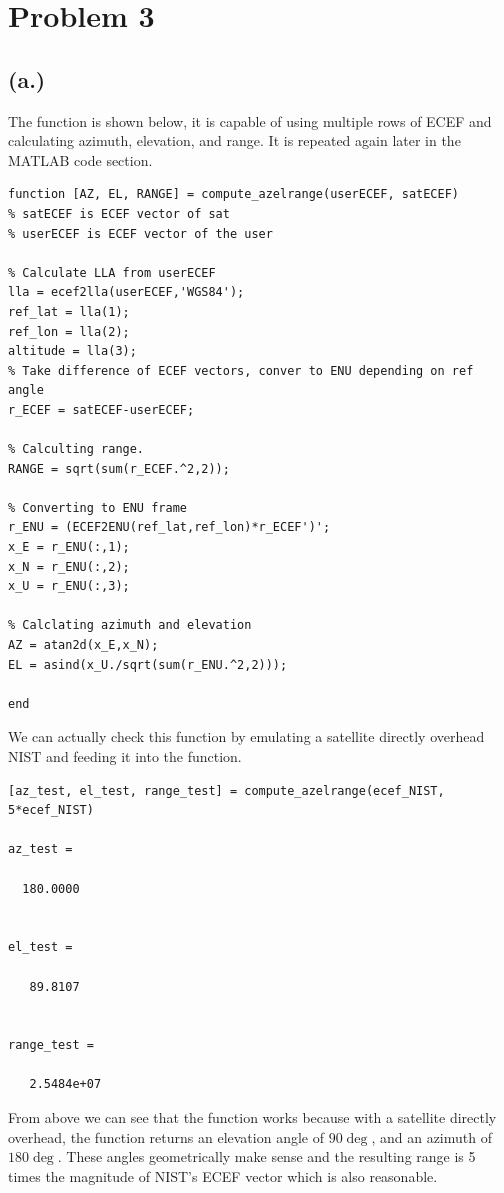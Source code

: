 \documentclass[11pt]{article}
\begin{document}
\section*{Problem 3}
\subsection*{(a.)}
\hspace*{2em}The function is shown below, it is capable of using multiple rows of ECEF and calculating
azimuth, elevation, and range. It is repeated again later in the MATLAB code section. 
\begin{verbatim}
function [AZ, EL, RANGE] = compute_azelrange(userECEF, satECEF)
% satECEF is ECEF vector of sat
% userECEF is ECEF vector of the user

% Calculate LLA from userECEF
lla = ecef2lla(userECEF,'WGS84');
ref_lat = lla(1);
ref_lon = lla(2);
altitude = lla(3);
% Take difference of ECEF vectors, conver to ENU depending on ref angle
r_ECEF = satECEF-userECEF;

% Calculting range.
RANGE = sqrt(sum(r_ECEF.^2,2));

% Converting to ENU frame
r_ENU = (ECEF2ENU(ref_lat,ref_lon)*r_ECEF')';
x_E = r_ENU(:,1);
x_N = r_ENU(:,2);
x_U = r_ENU(:,3);

% Calclating azimuth and elevation
AZ = atan2d(x_E,x_N);
EL = asind(x_U./sqrt(sum(r_ENU.^2,2)));

end
\end{verbatim}
\hspace*{2em}We can actually check this function by emulating a satellite directly overhead
NIST and feeding it into the function.

\begin{verbatim}
[az_test, el_test, range_test] = compute_azelrange(ecef_NIST, 5*ecef_NIST)

az_test =

  180.0000


el_test =

   89.8107


range_test =

   2.5484e+07

\end{verbatim}

\hspace*{2em}From above we can see that the function works because with a satellite directly overhead,
the function returns an elevation angle of $90\deg$, and an azimuth of $180\deg$. These angles geometrically
make sense and the resulting range is 5 times the magnitude of NIST's ECEF vector which is also reasonable.
\end{document}
